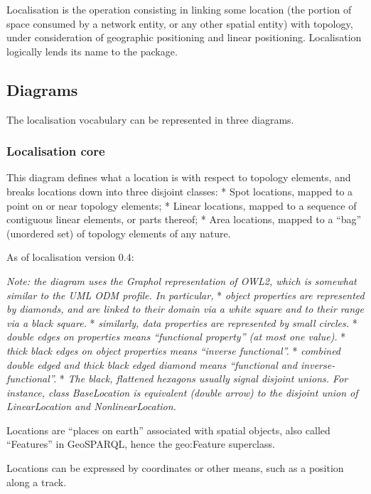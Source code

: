 \documentclass[
  11pt,
]{article}
\begin{document}
Localisation is the operation consisting in linking some location (the
portion of space consumed by a network entity, or any other spatial
entity) with topology, under consideration of geographic positioning and
linear positioning. Localisation logically lends its name to the
package.

\hypertarget{diagrams}{%
\subsection{Diagrams}\label{diagrams}}

The localisation vocabulary can be represented in three diagrams.

\hypertarget{localisation-core}{%
\subsubsection{Localisation core}\label{localisation-core}}

This diagram defines what a location is with respect to topology
elements, and breaks locations down into three disjoint classes: * Spot
locations, mapped to a point on or near topology elements; * Linear
locations, mapped to a sequence of contiguous linear elements, or parts
thereof; * Area locations, mapped to a ``bag'' (unordered set) of
topology elements of any nature.

As of localisation version 0.4:

\emph{Note: the diagram uses the Graphol representation of OWL2, which
is somewhat similar to the UML ODM profile. In particular,} *
\emph{object properties are represented by diamonds, and are linked to
their domain via a white square and to their range via a black square.}
* \emph{similarly, data properties are represented by small circles.} *
\emph{double edges on properties means ``functional property'' (at most
one value).} * \emph{thick black edges on object properties means
``inverse functional''.} * \emph{combined double edged and thick black
edged diamond means ``functional and inverse-functional''.} * \emph{The
black, flattened hexagons usually signal disjoint unions. For instance,
class BaseLocation is equivalent (double arrow) to the disjoint union of
LinearLocation and NonlinearLocation.}

Locations are ``places on earth'' associated with spatial objects, also
called ``Features'' in GeoSPARQL, hence the geo:Feature superclass.

Locations can be expressed by coordinates or other means, such as a
position along a track.
\end{document}
